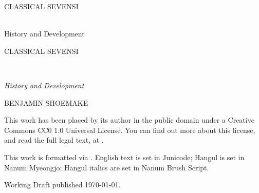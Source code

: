 \pagestyle{empty}


\begin{titlepage}

\begin{center}
\begin{large}CLASSICAL SEVENSI\end{large}\\
History and Development
\end{center}

\end{titlepage}

\emptybreak


\begin{titlepage}

\noindent\begin{huge}CLASSICAL SEVENSI\end{huge}\\
\begin{large}\emph{History and Development}\end{large}

\medskip

\noindent BENJAMIN SHOEMAKE

\end{titlepage}

\newpage

\begin{small}

\noindent This work has been placed by its author in the public domain under a Creative Commons CC0 1.0 Universal License.
You can find out more about this license, and read the full legal text, at \linebreak[0]\linebreak[0]\linebreak[0]\linebreak[0].

\medskip

\noindent This work is formatted via \XeLaTeX.
English text is set in Junicode; Hangul is set in Nanum Myeongjo; Hangul italics are set in Nanum Brush Script.

\medskip

\noindent Working Draft published \today.

\end{small}

